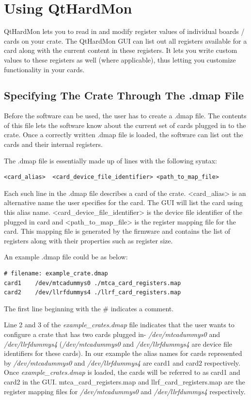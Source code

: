 \chapter{Using QtHardMon}

QtHardMon lets you to read in and modify register values of individual boards / cards on your crate. The QtHardMon GUI can list out all registers available for a card along with the current content in these registers. It lets you write custom values to these registers as well (where applicable), thus letting you customize functionality in your cards.

\section{Specifying The Crate Through The .dmap File}
Before the software can be used, the user has to create a .dmap file. The contents of this file lets the software know about the current set of cards plugged in to the crate. Once a correctly written .dmap file is loaded, the software can list out the cards and their internal registers. 

The .dmap file is essentially made up of lines with the following syntax:
\begin{lstlisting}
<card_alias>  <card_device_file_identifier> <path_to_map_file>
\end{lstlisting}

Each such line in the .dmap file describes a card of the crate.
\mbox{\textless card\_alias\textgreater}  is an alternative name the user specifies for the card. The GUI will list the card using this alias name.
\mbox{\textless card\_device\_file\_identifier\textgreater} is the device file identifier of the plugged in card and \mbox{\textless path\_to\_map\_file\textgreater} is the register mapping file for the card. This mapping file is generated by the firmware and contains the list of registers along with their properties such as register size.
	

An example .dmap file could be as below:
\begin{lstlisting}
# filename: example_crate.dmap
card1    /dev/mtcadummys0 ./mtca_card_registers.map
card2    /dev/llrfdummys4 ./llrf_card_registers.map
\end{lstlisting}


The first line beginning with the \# indicates a comment. 

Line 2 and 3 of the \textit{example\_crates.dmap} file indicates that the user wants to configure a crate that has two cards plugged in- \textit{/dev/mtcadummys0} and \textit{/dev/llrfdummys4} (\textit{/dev/mtcadummys0} and \textit{/dev/llrfdummys4} are device file identifiers for these cards).  In our example the alias names for cards represented by \textit{/dev/mtcadummys0} and \textit{/dev/llrfdummys4} are card1 and card2 respectively. Once \textit{example\_crates.dmap} is loaded, the cards will be referred to as card1 and card2 in the GUI.
mtca\_card\_registers.map and llrf\_card\_registers.map are the register mapping files for \textit{/dev/mtcadummys0} and \textit{/dev/llrfdummys4} respectively. 


